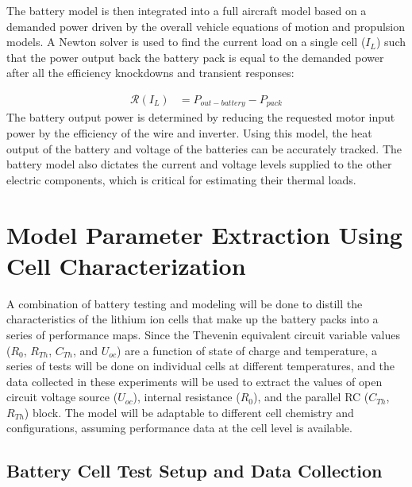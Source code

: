 \documentclass[]{aiaa-tc}%
\begin{document}
%
The battery model is then integrated into a full aircraft model based on a demanded power driven by the overall vehicle equations of motion and propulsion models. 
A Newton solver is used to find the current load on a single cell ($I_L$) such that the power output back the battery pack is equal to the demanded power after all the efficiency knockdowns and transient responses:

\begin{align}
\mathcal{R}(I_L) &= P_{out-battery} - P_{pack} \label{eq:resid_I_L}
\end{align}
%
The battery output power is determined by reducing the requested motor input power by the efficiency of the wire and inverter.  Using this model, the heat output of the battery and voltage of the batteries can be accurately tracked. The battery model also dictates the current and voltage levels supplied to the other electric components, which is critical for estimating their thermal loads.


\section{Model Parameter Extraction Using Cell Characterization}

A combination of battery testing and modeling will be done to distill the characteristics of the lithium ion cells that make up the battery packs into a series of performance maps. Since the Thevenin equivalent circuit variable values ($R_{0}$, $R_{Th}$, $C_{Th}$, and $U_{oc}$) are a function of state of charge and temperature, a series of tests will be done on individual cells at different temperatures, and the data collected in these experiments will be used to extract the values of open circuit voltage source ($U_{oc}$), internal resistance ($R_{0}$), and the parallel RC ($C_{Th}$, $R_{Th}$) block. The model will be adaptable to different cell chemistry and configurations, assuming performance data at the cell level is available.



\subsection{Battery Cell Test Setup and Data Collection}
\end{document}
